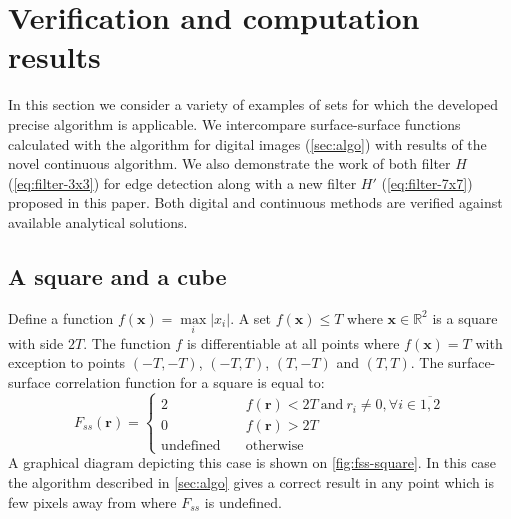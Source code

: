 \documentclass[preprint]{elsarticle}
\begin{document}
\section{Verification and computation results}
\label{sec:results}
In this section we consider a variety of examples of sets for which the developed
precise algorithm is applicable. We intercompare surface-surface functions
calculated with the algorithm for digital images (\cref{sec:algo}) with results
of the novel continuous algorithm. We also demonstrate the work of both filter
$H$ (\ref{eq:filter-3x3}) for edge detection along with a new filter $H'$
(\ref{eq:filter-7x7}) proposed in this paper. Both digital and
continuous methods are verified against available analytical solutions.

\subsection{A square and a cube}
Define a function $f(\bm{x}) = \max\limits_i |x_i|$. A set $f(\bm{x}) \le T$
where $\bm{x} \in \mathbb{R}^2$ is a square with side $2T$. The function $f$ is
differentiable at all points where $f(\bm{x}) = T$ with exception to points
$(-T, -T)$, $(-T, T)$, $(T, -T)$ and $(T, T)$. The surface-surface correlation
function for a square is equal to:
\begin{equation}
  F_{ss}(\bm{r}) = \left\{
  \begin{array}{ll}
    2 & \quad f(\bm{r}) < 2T \ \text{and}\ r_i \ne 0, \forall i \in \overline{1,2} \\
    0 & \quad f(\bm{r}) > 2T \\
    \text{undefined} & \quad \text{otherwise}
  \end{array}
  \right.
\end{equation}
A graphical diagram depicting this case is shown on \cref{fig:fss-square}. In
this case the algorithm described in \cref{sec:algo} gives a correct result in
any point which is few pixels away from where $F_{ss}$ is undefined.
\end{document}
